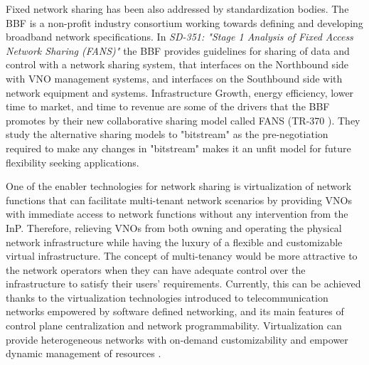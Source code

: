 Fixed network sharing has been also addressed by standardization bodies. The \ac{BBF} is a non-profit industry consortium working towards defining and developing broadband network specifications. In \textit{SD-351: "Stage 1 Analysis of Fixed Access Network Sharing (FANS)" }\cite{bforum2015} the \ac{BBF} provides guidelines for sharing of data and control with a network sharing system, that interfaces on the Northbound side with \ac{VNO} management systems, and interfaces on the Southbound side with network equipment and systems.
Infrastructure Growth, energy efficiency, lower time to market, and time to revenue are some of the drivers that the \ac{BBF} promotes by their new collaborative sharing model called \ac{FANS} (TR-370 \cite{bbfTR370}).
They study the alternative sharing models to "bitstream" as the pre-negotiation required to make any changes in "bitstream" makes it an unfit model for future flexibility seeking applications. %


One of the enabler technologies for network sharing is  virtualization of network functions that can facilitate multi-tenant network scenarios by providing \acp{VNO} with immediate access to network functions without any intervention from the \ac{InP}. Therefore, relieving \acp{VNO} from both owning and operating the physical network infrastructure while having the luxury of a flexible and customizable virtual infrastructure. 
The concept of multi-tenancy would be more attractive to the network operators when they can have adequate control over the infrastructure to satisfy their users' requirements. Currently, this can be achieved thanks to the virtualization technologies introduced to telecommunication networks empowered by software defined networking, and its main features of control plane centralization and network programmability. Virtualization can provide heterogeneous networks with on-demand customizability and empower dynamic management of resources \cite{7929272}.

